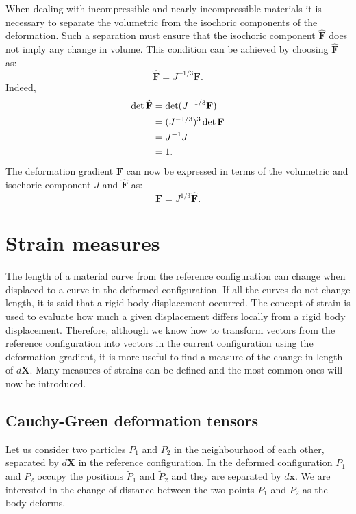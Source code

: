When dealing with incompressible and nearly incompressible materials it is necessary to separate the volumetric from the isochoric components of the deformation. Such a separation must ensure that the isochoric component $\mathbf{\hat{F}}$ does not imply any change in volume. This condition can be achieved by choosing $\mathbf{\hat{F}}$ as:
\begin{equation}
\mathbf{\hat{F}} = J^{-1/3} \mathbf{F}.
\end{equation}
Indeed,
\begin{align}
\det \mathbf{\hat{F}} &= \det (J^{-1/3} \mathbf{F}) \notag \\
&= (J^{-1/3})^3 \det \mathbf{F} \notag \\
&= J^{-1} J \notag \\
&= 1.
\end{align}
The deformation gradient $\mathbf{F}$ can now be expressed in terms of the volumetric and isochoric component $J$ and $\mathbf{\hat{F}}$ as:
\begin{equation}
\mathbf{F} = J^{1/3} \mathbf{\hat{F}}.
\end{equation}
			
			
\section{Strain measures}
The length of a material curve from the reference configuration can change when displaced to a curve in the deformed configuration. If all the curves do not change length, it is said that a rigid body displacement occurred. The concept of strain is used to evaluate how much a given displacement differs locally from a rigid body displacement. Therefore, although we know how to transform vectors from the reference configuration into vectors in the current configuration using the deformation gradient, it is more useful to find a measure of the change in length of $d\mathbf{X}$. Many measures of strains can be defined and the most common ones will now be introduced. 

	\subsection{Cauchy-Green deformation tensors}
Let us consider two particles $P_{1}$ and $P_{2}$ in the neighbourhood of each other, separated by $d\mathbf{X}$ in the reference configuration. In the deformed configuration $P_{1}$ and $P_{2}$ occupy the positions $\tilde{P}_{1}$ and $\tilde{P}_{2}$ and they are separated by $d\mathbf{x}$. We are interested in the change of distance between the two points $P_{1}$ and $P_{2}$ as the body deforms. 

